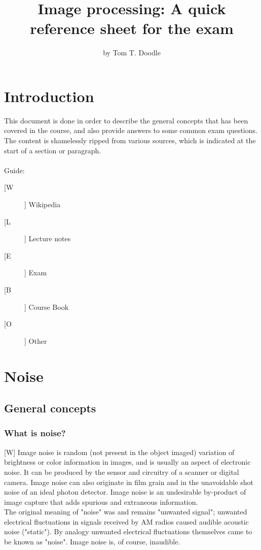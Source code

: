 \documentclass[12pt]{article}
\title{Image processing: A quick reference sheet for the exam}
\author{by Tom T. Doodle}
\begin{document}
\maketitle
\newpage
\tableofcontents
\newpage

\section{Introduction}
	This document is done in order to describe the general concepts
	that has been covered in the course, and also provide answers to
	some common exam questions. The content is shamelessly ripped from
	various sources, which is indicated at the start of a section
	or paragraph.\\
	\\	
	Guide:
	\begin{description}
		\item[[W]] Wikipedia
		\item[[L]] Lecture notes
		\item[[E]] Exam
		\item[[B]] Course Book
		\item[[O]] Other
	\end{description}
	
%	
%
\section{Noise}
	\subsection{General concepts}
	\subsubsection{What is noise?}
	
	[W] Image noise is random (not present in the object imaged) variation of brightness or
	color information in images, and is usually an aspect of electronic noise. It can be
	produced by the sensor and circuitry of a scanner or digital camera. Image noise can
	also originate in film grain and in the unavoidable shot noise of an ideal photon 
	detector. Image noise is an undesirable by-product of image capture that adds spurious 
	and extraneous information.\\
	
	The original meaning of "noise" was and remains "unwanted signal"; unwanted electrical
	fluctuations in signals received by AM radios caused audible acoustic noise ("static").
	By analogy unwanted electrical fluctuations themselves came to be known as "noise". 
	Image noise is, of course, inaudible.\\
\end{document}
